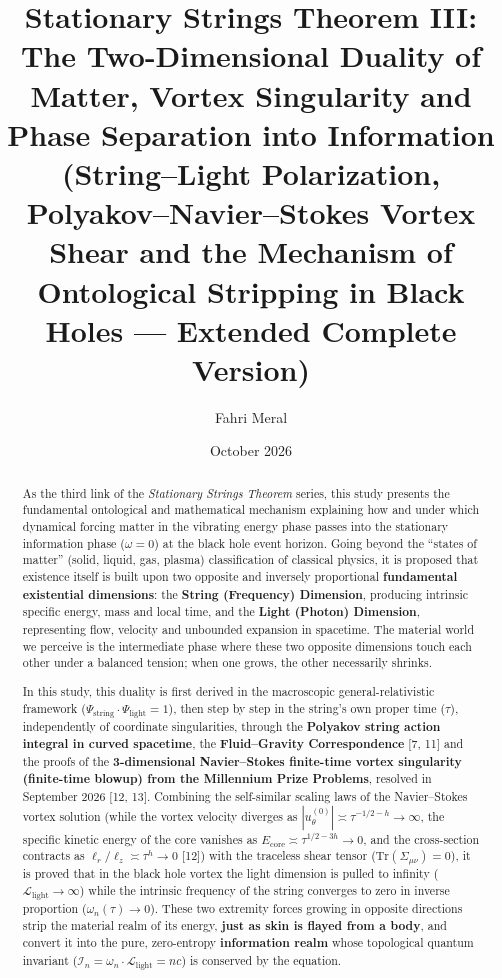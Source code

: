 \documentclass[12pt,a4paper]{article}
\title{\textbf{Stationary Strings Theorem III: The Two-Dimensional Duality of Matter, Vortex Singularity and Phase Separation into Information} \\[0.3cm]
\large (String--Light Polarization, Polyakov--Navier--Stokes Vortex Shear and the Mechanism of Ontological Stripping in Black Holes --- Extended Complete Version)}
\author{Fahri Meral}
\date{October 2026}
\begin{document}
\maketitle

\begin{abstract}
As the third link of the \textit{Stationary Strings Theorem} series, this study presents the fundamental ontological and mathematical mechanism explaining how and under which dynamical forcing matter in the vibrating energy phase passes into the stationary information phase ($\omega = 0$) at the black hole event horizon. Going beyond the ``states of matter'' (solid, liquid, gas, plasma) classification of classical physics, it is proposed that existence itself is built upon two opposite and inversely proportional \textbf{fundamental existential dimensions}: the \textbf{String (Frequency) Dimension}, producing intrinsic specific energy, mass and local time, and the \textbf{Light (Photon) Dimension}, representing flow, velocity and unbounded expansion in spacetime. The material world we perceive is the intermediate phase where these two opposite dimensions touch each other under a balanced tension; when one grows, the other necessarily shrinks.

In this study, this duality is first derived in the macroscopic general-relativistic framework ($\Psi_{\text{string}} \cdot \Psi_{\text{light}} = 1$), then step by step in the string's own proper time ($\tau$), independently of coordinate singularities, through the \textbf{Polyakov string action integral in curved spacetime}, the \textbf{Fluid--Gravity Correspondence} [7, 11] and the proofs of the \textbf{3-dimensional Navier--Stokes finite-time vortex singularity (finite-time blowup) from the Millennium Prize Problems}, resolved in September 2026 [12, 13]. Combining the self-similar scaling laws of the Navier--Stokes vortex solution (while the vortex velocity diverges as $|u_\theta^{(0)}| \asymp \tau^{-1/2-h} \to \infty$, the specific kinetic energy of the core vanishes as $E_{\text{core}} \asymp \tau^{1/2-3h} \to 0$, and the cross-section contracts as $\ell_r/\ell_z \asymp \tau^h \to 0$ [12]) with the traceless shear tensor ($\text{Tr}(\Sigma_{\mu\nu})=0$), it is proved that in the black hole vortex the light dimension is pulled to infinity ($\mathcal{L}_{\text{light}} \to \infty$) while the intrinsic frequency of the string converges to zero in inverse proportion ($\omega_n(\tau) \to 0$). These two extremity forces growing in opposite directions strip the material realm of its energy, \textbf{just as skin is flayed from a body}, and convert it into the pure, zero-entropy \textbf{information realm} whose topological quantum invariant ($\mathcal{I}_n = \omega_n \cdot \mathcal{L}_{\text{light}} = n c$) is conserved by the equation.
\end{abstract}
\end{document}
